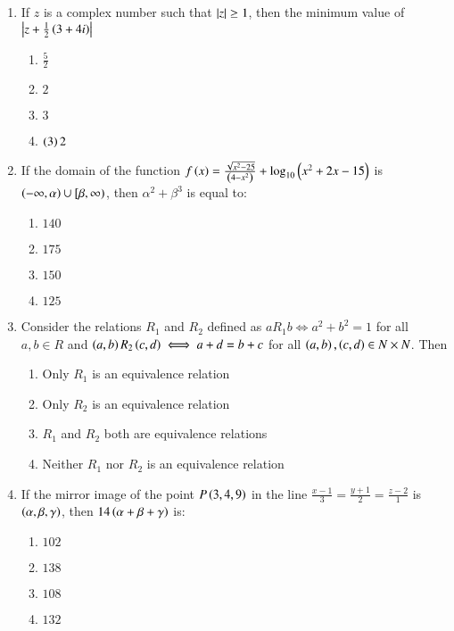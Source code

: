 \documentclass[journal]{IEEEtran}
\begin{document}
\begin{enumerate}
{\begin{multicols}{4}
\begin{enumerate}
\item $2$
\item $1$
\item $3$
\item $\frac{3}{2}$
\end{enumerate}
\end{multicols}
}
\item{
If $z$ is a complex number such that $\left\vert z\right\vert\geq 1$, then the minimum value of $\left\vert z+\frac{1}{2}\left(3+4i\right)\right\vert$
\begin{multicols}{4}
\begin{enumerate}
\item $\frac{5}{2}$
\item $2$
\item $3$
\item $\left(3\right){2}$
\end{enumerate}
\end{multicols}
}
\item{
If the domain of the function $f\left(x\right)=\frac{\sqrt{x^2-25}}{\left(4-x^2\right)}+\log_{10}\left(x^2+2x-15\right)$ is $\left(-\infty,\alpha\right)\cup[\beta,\infty)$, then $\alpha ^2+\beta ^3$ is equal to:
\begin{multicols}{4}
\begin{enumerate}
\item $140$
\item $175$
\item $150$
\item $125$
\end{enumerate}
\end{multicols}
}
\item{
Consider the relations $R_1$ and $R_2$ defined as $aR_1b\iff a^2+b^2=1$ for all $a,b\in R$ and $\left(a,b\right)R_2\left(c,d\right)\iff a+d=b+c$ for all $\left(a,b\right),\left(c,d\right)\in N\times N$. Then
\begin{enumerate}
\item Only $R_1$ is an equivalence relation 
\item Only $R_2$ is an equivalence relation 
\item $R_1$ and $R_2$ both are equivalence relations
\item Neither $R_1$ nor $R_2$ is an equivalence relation
\end{enumerate}
}
\item{
If the mirror image of the point $P\left(3,4,9\right)$ in the line $\frac{x-1}{3}=\frac{y+1}{2}=\frac{z-2}{1}$ is $\left(\alpha,\beta,\gamma\right)$, then $14\left(\alpha+\beta+\gamma\right)$ is:
\begin{multicols}{4}
\begin{enumerate}
\item $102$
\item $138$
\item $108$
\item $132$
\end{enumerate}
\end{multicols}
}
\end{enumerate}
\end{document}
